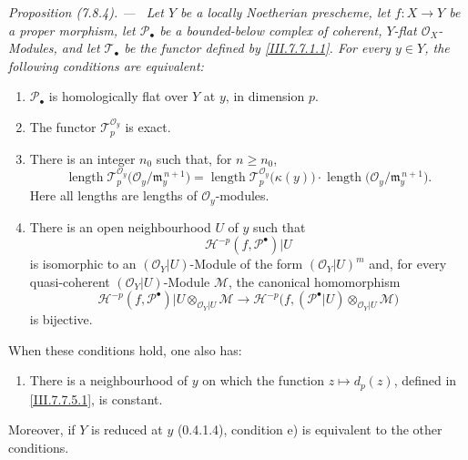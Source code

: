\documentclass[10pt,oneside]{book}
\newcommand{\sh}[1]{\mathscr{#1}}
\newcommand{\kres}{\kappa}
\newcommand{\sref}[2][]{(#2)}
\newenvironment{proposition}[1][]{\par\medskip\noindent\itshape Proposition (#1). ---\ }{\par}
\begin{document}
\begin{proposition}[7.8.4]
\label{III.7.8.4}
Let $Y$ be a locally Noetherian prescheme, let
$f:X\to Y$ be a proper morphism, let $\sh{P}_\bullet$ be a
bounded-below complex of coherent, $Y$-flat
$\sh{O}_X$-Modules, and let $\sh{T}_\bullet$ be the functor
defined by \eqref{III.7.7.1.1}.  For every $y\in Y$, the
following conditions are equivalent:
\begin{enumerate}
  \item[a)] $\sh{P}_\bullet$ is homologically flat over $Y$
  at $y$, in dimension $p$.
  \item[b)] The functor $\sh{T}_p^{\sh{O}_y}$ is exact.
  \item[c)] There is an integer $n_0$ such that, for
  $n\geq n_0$,
  \[
    \operatorname{length}
      \sh{T}_p^{\sh{O}_y}
        \bigl(\sh{O}_y/\mathfrak m_y^{\,n+1}\bigr)
    =
    \operatorname{length}
      \sh{T}_p^{\sh{O}_y}\bigl(\kres(y)\bigr)
    \cdot
    \operatorname{length}
      \bigl(\sh{O}_y/\mathfrak m_y^{\,n+1}\bigr).
    \tag{7.8.4.1}\label{III.7.8.4.1}
  \]
  Here all lengths are lengths of $\sh{O}_y$-modules.
  \item[d)] There is an open neighbourhood $U$ of $y$ such
  that
  \[
    \mathscr{H}^{-p}(f,\sh{P}^\bullet)|U
  \]
  is isomorphic to an $(\sh{O}_Y|U)$-Module of the form
  $(\sh{O}_Y|U)^m$ and, for every quasi-coherent
  $(\sh{O}_Y|U)$-Module $\sh{M}$, the canonical
  homomorphism
  \[
    \mathscr{H}^{-p}(f,\sh{P}^\bullet)|U
      \otimes_{\sh{O}_Y|U}\sh{M}
    \longrightarrow
    \mathscr{H}^{-p}
      \bigl(f,(\sh{P}^\bullet|U)
        \otimes_{\sh{O}_Y|U}\sh{M}\bigr)
    \tag{7.8.4.2}\label{III.7.8.4.2}
  \]
  is bijective.
\end{enumerate}
When these conditions hold, one also has:
\begin{enumerate}
  \item[e)] There is a neighbourhood of $y$ on which the
  function $z\mapsto d_p(z)$, defined in
  \eqref{III.7.7.5.1}, is constant.
\end{enumerate}
Moreover, if $Y$ is reduced at $y$ \sref[0]{0.4.1.4},
condition e) is equivalent to the other conditions.
\end{proposition}
\end{document}
